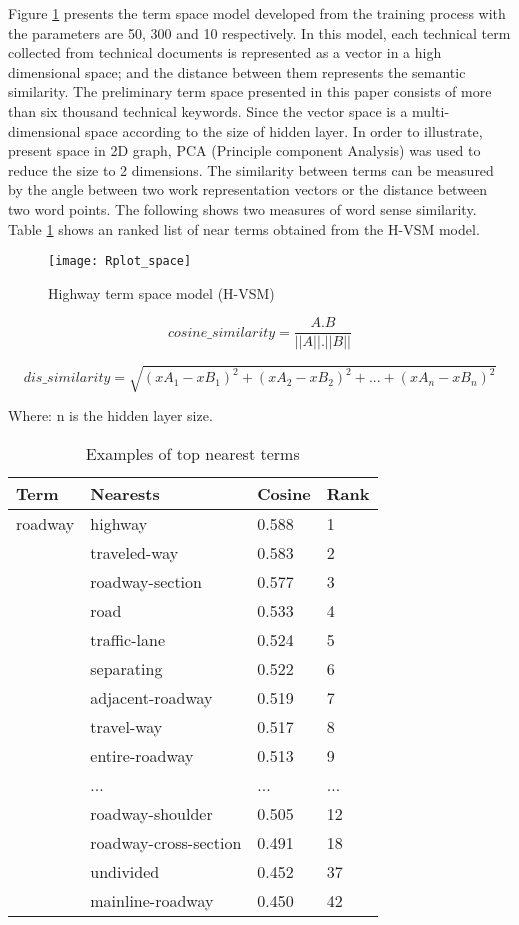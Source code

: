\documentclass[Journal, InsideFigs, DoubleSpace]{ascelike} %
\begin{document}
%
Figure \ref{fig:hvsm} presents the term space model developed from the training process with the parameters are 50, 300 and 10 respectively. In this model, each technical term collected from technical documents is represented as a vector in a high dimensional space; and the distance between them represents the semantic similarity. The preliminary term space presented in this paper consists of more than six thousand technical keywords. Since the vector space is a multi-dimensional space according to the size of hidden layer. In order to illustrate, present space in 2D graph, PCA (Principle component Analysis) was used to reduce the size to 2 dimensions. The similarity between terms can be measured by the angle between two work representation vectors or the distance between two word points. The following shows two measures of word sense similarity. Table \ref{table:nearest_example} shows an ranked list of near terms obtained from the H-VSM model.
%
\begin{figure}[t]
	\centering
	\texttt{[image: Rplot\_space]}
	\caption{Highway term space model (H-VSM)}
	\label{fig:hvsm}
\end{figure}
%
\begin{equation}
cosine\_similarity = \frac{A.B}{||A||.||B||}
\end{equation}

\begin{equation}
dis\_similarity =\sqrt{(xA_1-xB_1)^2+(xA_2-xB_2)^2+...+(xA_n-xB_n)^2}
\end{equation}

Where: n is the hidden layer size.
%
\begin{table} [t]
	\caption{Examples of top nearest terms}
	\label{table:nearest_example}
	\centering
	\small
	\renewcommand{\arraystretch}{1.25}
	\begin{tabular}{l l l  l}
		\hline
		\textbf{Term} & \textbf{Nearests} & \textbf{Cosine} &\textbf{Rank}\\
		\hline
		roadway			& highway & 0.588 & 1\\
						& traveled-way & 0.583 & 2\\
						& roadway-section & 0.577 & 3\\
						& road & 0.533 & 4\\
						& traffic-lane & 0.524 &5\\
						& separating & 0.522 &6\\
						& adjacent-roadway & 0.519 & 7\\
						& travel-way & 0.517 & 8\\
						& entire-roadway & 0.513 & 9\\
						& ...&...& ...\\
						& roadway-shoulder & 0.505 & 12\\
						& roadway-cross-section & 0.491 & 18\\
						& undivided & 0.452 & 37\\
						& mainline-roadway & 0.450 & 42\\
		\hline
	\end{tabular}
	\normalsize
\end{table}
\end{document}
